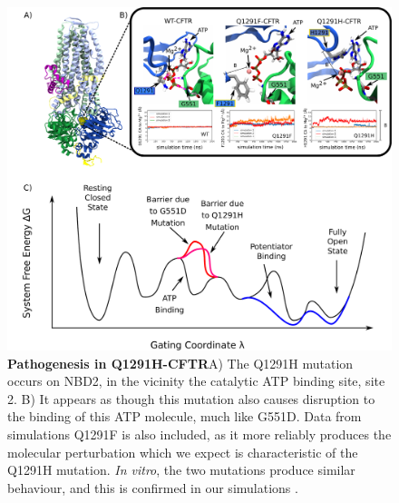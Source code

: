 \begin{figure}
	\begin{center}
		\includegraphics[width=\textwidth]{figures/perspective/Q1291.pdf}
	\end{center}
	\captionsetup{singlelinecheck = false, justification=raggedright}
	\caption[Pathogenesis in Q1291H-CFTR]{\textbf{Pathogenesis in Q1291H-CFTR}{A) The Q1291H mutation occurs on NBD2, in the vicinity the catalytic ATP binding site, site 2. B) It appears as though this mutation also causes disruption to the binding of this ATP molecule, much like G551D. Data from simulations Q1291F is also included, as it more reliably produces the molecular perturbation which we expect is characteristic of the Q1291H mutation. \textit{In vitro}, the two mutations produce similar behaviour, and this is confirmed in our simulations \cite{dong2015}. }}

	\label{Q1291H_results}

\end{figure}




